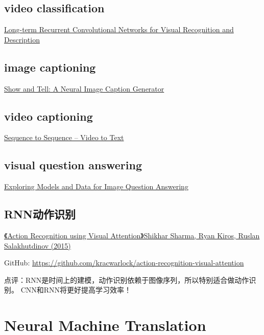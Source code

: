\documentclass[UTF8,11pt,a4paper]{ctexart}
\begin{document}
\subsection{video classification}
\href{https://arxiv.org/abs/1411.4389}{Long-term Recurrent Convolutional Networks for Visual Recognition and Description}

\subsection{image captioning}
\href{https://arxiv.org/pdf/1411.4555.pdf}{Show and Tell: A Neural Image Caption Generator}

\subsection{video captioning}
\href{https://arxiv.org/abs/1505.00487}{Sequence to Sequence -- Video to Text}


\subsection{visual question answering}
\href{https://arxiv.org/abs/1505.02074}{Exploring Models and Data for Image Question Answering}


\subsection{RNN动作识别}
\href{http://t.cn/RU8EKNZ}{《Action Recognition using Visual Attention》Shikhar Sharma, Ryan Kiros, Ruslan Salakhutdinov (2015)}

GitHub: \url{https://github.com/kracwarlock/action-recognition-visual-attention}

点评：RNN是时间上的建模，动作识别依赖于图像序列，所以特别适合做动作识别。 CNN和RNN将更好提高学习效率！

\section{Neural Machine Translation}
\end{document}
